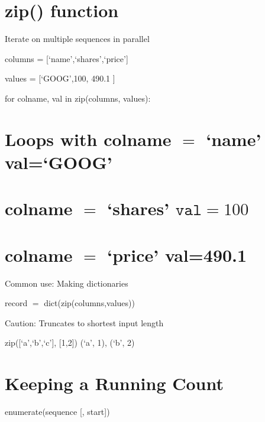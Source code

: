 \documentclass[
  letterpaper,
  DIV=11,
  numbers=noendperiod]{scrreprt}
\begin{document}

\chapter{zip() function}\label{zip-function}

Iterate on multiple sequences in parallel

columns = {[}`name',`shares',`price'{]}

values = {[}`GOOG',100, 490.1 {]}

for colname, val in zip(columns, values):


\chapter{\texorpdfstring{Loops with colname \(=\) `name'
val=`GOOG'}{Loops with colname = `name' val=`GOOG'}}\label{loops-with-colname-name-valgoog}


\chapter{\texorpdfstring{colname \({ } = { }\) `shares'
\(\mathtt { v a l } { = } 1 0 0\)}{colname \{ \} = \{ \} `shares' \textbackslash mathtt \{ v a l \} \{ = \} 1 0 0}}\label{colname-shares-mathtt-v-a-l-1-0-0}


\chapter{\texorpdfstring{colname \(=\) `price'
val=490.1}{colname = `price' val=490.1}}\label{colname-price-val490.1}

Common use: Making dictionaries

record \(=\) dict(zip(columns,values))

Caution: Truncates to shortest input length

zip({[}`a',`b',`c'{]}, {[}1,2{]}) (`a', 1), (`b', 2)


\chapter{Keeping a Running Count}\label{keeping-a-running-count}

enumerate(sequence {[}, start{]})
\end{document}
